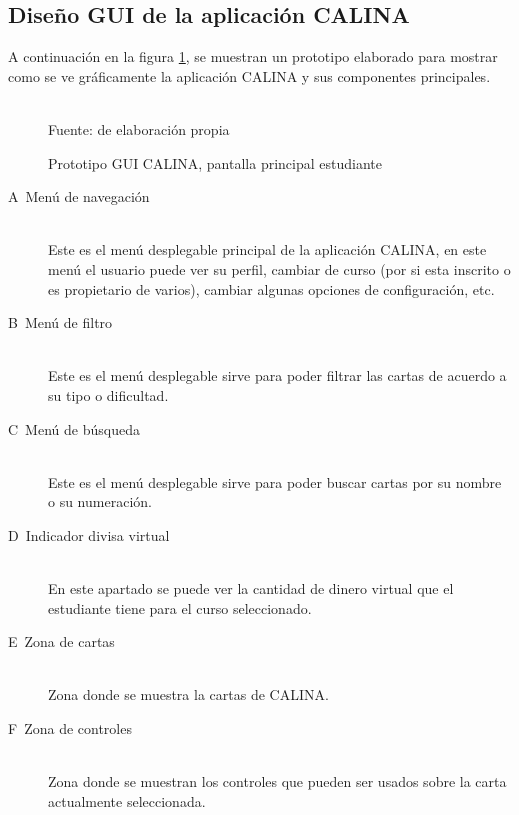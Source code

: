 \subsection{Diseño GUI de la aplicación CALINA}

A continuación en la figura \ref{img:guicalina}, se muestran un prototipo elaborado para mostrar como se ve 
gráficamente la aplicación CALINA y sus componentes principales.

\begin{figure}[!htb]
\caption{Prototipo GUI CALINA, pantalla principal estudiante}
\label{img:guicalina}
\centering
\begin{adjustbox}{width=15cm}
	
\end{adjustbox}
\\
{\footnotesize Fuente: de elaboración propia}
\end{figure}

\begin{description}
  \item[\textlangle A\textrangle\ Menú de navegación] \hfill \\ Este es el menú desplegable principal de la 
	aplicación CALINA, en este menú el usuario puede ver su perfil, cambiar de curso (por si esta 
	inscrito o es propietario de varios), cambiar algunas opciones de configuración, etc.
  \item[\textlangle B\textrangle\ Menú de filtro] \hfill \\ Este es el menú desplegable sirve para poder 
	filtrar las cartas de acuerdo a su tipo o dificultad.
  \item[\textlangle C\textrangle\ Menú de búsqueda] \hfill \\ Este es el menú desplegable sirve para poder 
	buscar cartas por su nombre o su numeración.
  \item[\textlangle D\textrangle\ Indicador divisa virtual] \hfill \\ En este apartado se puede ver la 
	cantidad de dinero virtual que el estudiante tiene para el curso seleccionado.
  \item[\textlangle E\textrangle\ Zona de cartas] \hfill \\ Zona donde se muestra la cartas de CALINA.
  \item[\textlangle F\textrangle\ Zona de controles] \hfill \\ Zona donde se muestran los controles que pueden 
	ser usados sobre la carta actualmente seleccionada.
\end{description}

